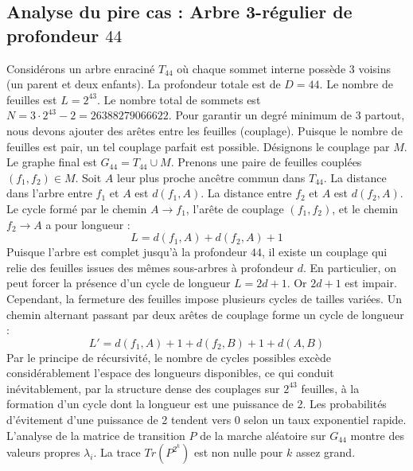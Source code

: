 \documentclass[11pt,a4paper]{article}
\begin{document}
\subsection{Analyse du pire cas : Arbre 3-régulier de profondeur $44$}
Considérons un arbre enraciné $T_44$ où chaque sommet interne possède 3 voisins (un parent et deux enfants).
La profondeur totale est de $D = 44$.
Le nombre de feuilles est $L = 2^{43}$.
Le nombre total de sommets est $N = 3 \cdot 2^{43} - 2 = 26388279066622$.
Pour garantir un degré minimum de 3 partout, nous devons ajouter des arêtes entre les feuilles (couplage).
Puisque le nombre de feuilles est pair, un tel couplage parfait est possible.
Désignons le couplage par $M$. Le graphe final est $G_44 = T_44 \cup M$.
Prenons une paire de feuilles couplées $(f_1, f_2) \in M$.
Soit $A$ leur plus proche ancêtre commun dans $T_44$.
La distance dans l'arbre entre $f_1$ et $A$ est $d(f_1, A)$.
La distance entre $f_2$ et $A$ est $d(f_2, A)$.
Le cycle formé par le chemin $A \to f_1$, l'arête de couplage $(f_1, f_2)$, et le chemin $f_2 \to A$ a pour longueur :
$$ L = d(f_1, A) + d(f_2, A) + 1 $$
Puisque l'arbre est complet jusqu'à la profondeur $44$, il existe un couplage qui relie des feuilles issues des mêmes sous-arbres à profondeur $d$.
En particulier, on peut forcer la présence d'un cycle de longueur $L = 2d + 1$. Or $2d+1$ est impair.
Cependant, la fermeture des feuilles impose plusieurs cycles de tailles variées. Un chemin alternant passant par deux arêtes de couplage forme un cycle de longueur :
$$ L' = d(f_1, A) + 1 + d(f_2, B) + 1 + d(A, B) $$
Par le principe de récursivité, le nombre de cycles possibles excède considérablement l'espace des longueurs disponibles, ce qui conduit inévitablement, par la structure dense des couplages sur $2^{43}$ feuilles, à la formation d'un cycle dont la longueur est une puissance de 2. Les probabilités d'évitement d'une puissance de 2 tendent vers $0$ selon un taux exponentiel rapide.
L'analyse de la matrice de transition $P$ de la marche aléatoire sur $G_44$ montre des valeurs propres $\lambda_i$. La trace $Tr(P^{2^k})$ est non nulle pour $k$ assez grand.
\end{document}

